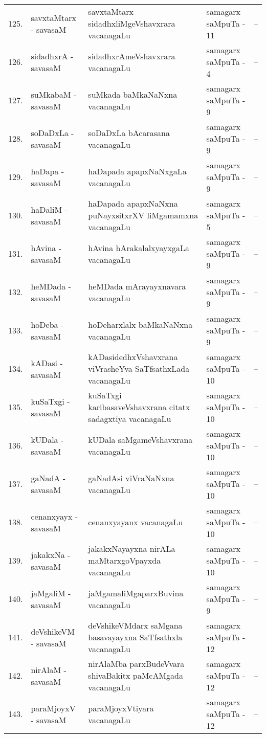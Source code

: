 {\begin{longtable}{rl>{\raggedright}p{5.5cm}lc}
125. & savxtaMtarx - savasaM &  savxtaMtarx sidadhxliMgeVshavxrara vacanagaLu & samagarx saMpuTa - 11 & --\\
126. & sidadhxrA - savasaM & sidadhxrAmeVshavxrara vacanagaLu & samagarx saMpuTa - 4 & --\\
127. & suMkabaM - savasaM & suMkada baMkaNaNxna vacanagaLu & samagarx saMpuTa - 9 & --\\
128. & soDaDxLa - savasaM &  soDaDxLa bAcarasana vacanagaLu & samagarx saMpuTa - 9 & --\\
129. & haDapa - savasaM & haDapada apapxNaNxgaLa vacanagaLu & samagarx saMpuTa - 9 & --\\
130. & haDaliM - savasaM & haDapada apapxNaNxna puNayxsitxrXV liMgamamxna vacanagaLu & samagarx saMpuTa - 5 & --\\
131. & hAvina - savasaM & hAvina hArakalalxyayxgaLa vacanagaLu & samagarx saMpuTa - 9 & --\\
132. & heMDada - savasaM & heMDada mArayayxnavara vacanagaLu & samagarx saMpuTa - 9 & --\\
133. & hoDeba - savasaM & hoDeharxlalx baMkaNaNxna vacanagaLu & samagarx saMpuTa - 9 & --\\
134. &  kADasi - savasaM & kADasidedhxVshavxrana viVrasheYva SaTfsathxLada vacanagaLu & samagarx saMpuTa - 10 & --\\
135. & kuSaTxgi - savasaM & kuSaTxgi karibasaveVshavxrana citatx sadagxtiya vacanagaLu & samagarx saMpuTa - 10 & --\\
136. & kUDala - savasaM & kUDala saMgameVshavxrana vacanagaLu & samagarx saMpuTa - 10 & --\\
137. & gaNadA - savasaM & gaNadAsi viVraNaNxna vacanagaLu & samagarx saMpuTa - 10 & --\\
138. & cenanxyayx - savasaM & cenanxyayanx vacanagaLu & samagarx saMpuTa - 10 & --\\
139. & jakakxNa - savasaM & jakakxNayayxna nirALa maMtarxgoVpayxda vacanagaLu & samagarx saMpuTa - 10 & --\\
140. & jaMgaliM - savasaM & jaMgamaliMgaparxBuvina vacanagaLu & samagarx saMpuTa - 9 & --\\
141. & deVshikeVM - savasaM & deVshikeVMdarx saMgana basavayayxna SaTfsathxla vacanagaLu & samagarx saMpuTa - 12 & --\\
142. & nirAlaM - savasaM & nirAlaMba parxBudeVvara shivaBakitx paMcAMgada vacanagaLu & samagarx saMpuTa - 12 & --\\
143. & paraMjoyxV - savasaM & paraMjoyxVtiyara vacanagaLu & samagarx saMpuTa - 12 & --\\

\end{longtable}}
